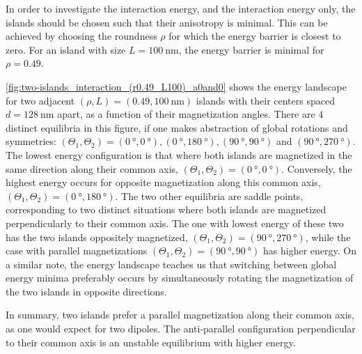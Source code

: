 \documentclass[11pt,a4paper,english,twoside]{article}
\begin{document}
In order to investigate the interaction energy, and the interaction energy only, the islands should be chosen such that their anisotropy is minimal. This can be achieved by choosing the roundness $\rho$ for which the energy barrier is closest to zero. For an island with size $L=\SI{100}{\nano\metre}$, the energy barrier is minimal for $\rho=0.49$. \par
\cref{fig:two-islands_interaction_(r0.49_L100)_a0and0} shows the energy landscape for two adjacent $(\rho, L)=(0.49, \SI{100}{\nano\metre})$ islands with their centers spaced $d=\SI{128}{\nano\metre}$ apart, as a function of their magnetization angles. There are 4 distinct equilibria in this figure, if one makes abstraction of global rotations and symmetries: $(\Theta_1, \Theta_2) = (\SI{0}{\degree},\SI{0}{\degree}), (\SI{0}{\degree}, \SI{180}{\degree}), (\SI{90}{\degree}, \SI{90}{\degree})$ and $(\SI{90}{\degree}, \SI{270}{\degree})$. The lowest energy configuration is that where both islands are magnetized in the same direction along their common axis, $(\Theta_1, \Theta_2) = (\SI{0}{\degree},\SI{0}{\degree})$. Conversely, the highest energy occurs for opposite magnetization along this common axis, $(\Theta_1, \Theta_2) = (\SI{0}{\degree},\SI{180}{\degree})$. The two other equilibria are saddle points, corresponding to two distinct situations where both islands are magnetized perpendicularly to their common axis. The one with lowest energy of these two has the two islands oppositely magnetized, $(\Theta_1, \Theta_2) = (\SI{90}{\degree}, \SI{270}{\degree})$, while the case with parallel magnetizations $(\Theta_1, \Theta_2) = (\SI{90}{\degree}, \SI{90}{\degree})$ has higher energy. On a similar note, the energy landscape teaches us that switching between global energy minima preferably occurs by simultaneously rotating the magnetization of the two islands in opposite directions. \par
In summary, two islands prefer a parallel magnetization along their common axis, as one would expect for two dipoles. The anti-parallel configuration perpendicular to their common axis is an unstable equilibrium with higher energy.
\end{document}
